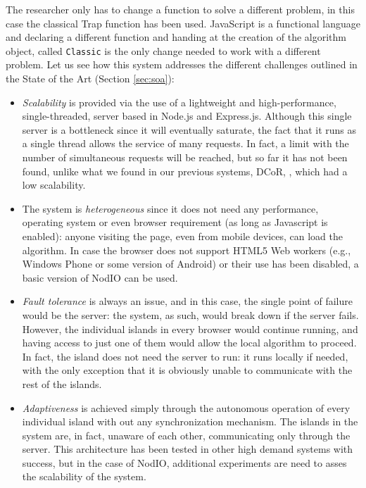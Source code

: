 \documentclass[journal,onecolumn]{IEEEtran}
\begin{document}
The researcher only has to change a function to solve a different
problem, in this case the classical Trap function \cite{Ackley1987} has been
used. JavaScript is a functional language and declaring a different
function and handing at the creation of the algorithm object, called
{\tt Classic} is the only change needed to work with a different
problem. Let us see how this system addresses the different challenges
outlined in the State of the Art (Section \ref{sec:soa}):\begin{itemize}
\item {\em Scalability} is provided via the use of a lightweight and
  high-performance, single-threaded, server based in Node.js and
  Express.js. Although this single server is a bottleneck since it
  will eventually saturate, the fact that it runs as a single thread
  allows the service of many requests. In fact, a limit with the
  number of simultaneous requests will be reached, but so far it has
  not been found, unlike what we found in our previous systems, DCoR,
  \cite{gecco07:workshop:dcor}, which had a low scalability. 
\item The system is {\em heterogeneous} since it does not need any
  performance, operating system or even browser requirement (as long
  as Javascript is enabled): anyone
  visiting the page, even from mobile devices, can load the algorithm.
  In case the browser does not support HTML5 Web workers (e.g., 
  Windows Phone or some version of Android) or their use
  has been disabled, a basic version of NodIO can be used.
\item {\em Fault tolerance} is always an issue, and in this case, the
  single point of failure would be the server: the system, as such,
  would break down if the server fails. However, the individual
  islands in every browser would continue running, and having access
  to just one of them would allow the local algorithm to proceed. In
  fact, the island does not need the server to run: it runs locally if
  needed, with the only exception that it is obviously unable to
  communicate with the rest of the islands.
\item {\em Adaptiveness} is achieved simply through the autonomous
  operation of every individual island with out any synchronization
  mechanism. The islands in the system are, in fact, unaware of each
  other, communicating only through the server. This architecture 
  has been tested in other high demand systems with success, but 
  in the case of NodIO, additional experiments are need to asses 
  the scalability of the system. 

\end{itemize}
\end{document}

